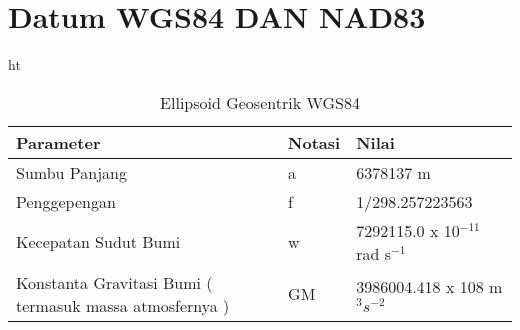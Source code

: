 \section{Datum WGS84 DAN NAD83}

\begin{table}{ht}
\caption{Ellipsoid Geosentrik WGS84}
\centering
\begin{tabular}{p{1.25in}p{1.25in}p{1.25in}}
\hline
Parameter&Notasi&Nilai\\
\hline
Sumbu Panjang & a & 6378137 m\\
Penggepengan & f & 1/298.257223563\\
Kecepatan Sudut Bumi & w & 7292115.0 x 10$^{-11}$ rad s$^{-1}$\\
Konstanta Gravitasi Bumi ( termasuk massa atmosfernya ) & GM & 3986004.418 x 108 m$^3$$ s^{-2}$\\
\hline
\end{tabular}
\label{table:contoh}
\end{table}

